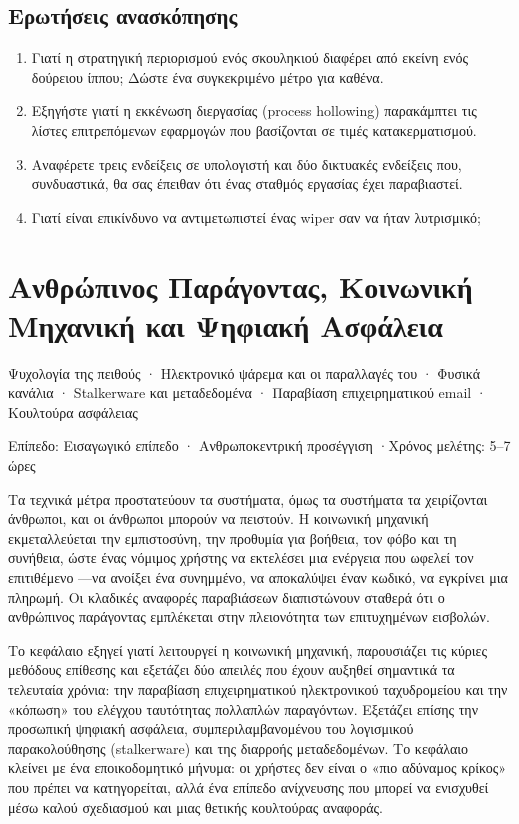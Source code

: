 \documentclass[11pt,openany]{book}
\newcommand{\chaptermeta}[3]{%
  {\sffamily\small\color{accent}#1\par}\vspace{0.3em}
  {\sffamily\footnotesize\color{gray}#2 \quad·\quad #3\par}\vspace{1.2em}}
\begin{document}
\section*{Ερωτήσεις ανασκόπησης}
\begin{enumerate}
  \item Γιατί η στρατηγική περιορισμού ενός σκουληκιού διαφέρει από εκείνη ενός δούρειου ίππου; Δώστε ένα συγκεκριμένο μέτρο για καθένα.
  \item Εξηγήστε γιατί η εκκένωση διεργασίας (process hollowing) παρακάμπτει τις λίστες επιτρεπόμενων εφαρμογών που βασίζονται σε τιμές κατακερματισμού.
  \item Αναφέρετε τρεις ενδείξεις σε υπολογιστή και δύο δικτυακές ενδείξεις που, συνδυαστικά, θα σας έπειθαν ότι ένας σταθμός εργασίας έχει παραβιαστεί.
  \item Γιατί είναι επικίνδυνο να αντιμετωπιστεί ένας wiper σαν να ήταν λυτρισμικό;
\end{enumerate}

\chapter{Ανθρώπινος Παράγοντας, Κοινωνική Μηχανική και Ψηφιακή Ασφάλεια}\label{ch:5}
\chaptermeta{Ψυχολογία της πειθούς · Ηλεκτρονικό ψάρεμα και οι παραλλαγές του · Φυσικά κανάλια · Stalkerware και μεταδεδομένα · Παραβίαση επιχειρηματικού email · Κουλτούρα ασφάλειας}{Επίπεδο: Εισαγωγικό επίπεδο · Ανθρωποκεντρική προσέγγιση}{Χρόνος μελέτης: 5–7 ώρες}

Τα τεχνικά μέτρα προστατεύουν τα συστήματα, όμως τα συστήματα τα χειρίζονται άνθρωποι, και οι άνθρωποι μπορούν να πειστούν. Η κοινωνική μηχανική εκμεταλλεύεται την εμπιστοσύνη, την προθυμία για βοήθεια, τον φόβο και τη συνήθεια, ώστε ένας νόμιμος χρήστης να εκτελέσει μια ενέργεια που ωφελεί τον επιτιθέμενο —να ανοίξει ένα συνημμένο, να αποκαλύψει έναν κωδικό, να εγκρίνει μια πληρωμή. Οι κλαδικές αναφορές παραβιάσεων διαπιστώνουν σταθερά ότι ο ανθρώπινος παράγοντας εμπλέκεται στην πλειονότητα των επιτυχημένων εισβολών.

Το κεφάλαιο εξηγεί γιατί λειτουργεί η κοινωνική μηχανική, παρουσιάζει τις κύριες μεθόδους επίθεσης και εξετάζει δύο απειλές που έχουν αυξηθεί σημαντικά τα τελευταία χρόνια: την παραβίαση επιχειρηματικού ηλεκτρονικού ταχυδρομείου και την «κόπωση» του ελέγχου ταυτότητας πολλαπλών παραγόντων. Εξετάζει επίσης την προσωπική ψηφιακή ασφάλεια, συμπεριλαμβανομένου του λογισμικού παρακολούθησης (stalkerware) και της διαρροής μεταδεδομένων. Το κεφάλαιο κλείνει με ένα εποικοδομητικό μήνυμα: οι χρήστες δεν είναι ο «πιο αδύναμος κρίκος» που πρέπει να κατηγορείται, αλλά ένα επίπεδο ανίχνευσης που μπορεί να ενισχυθεί μέσω καλού σχεδιασμού και μιας θετικής κουλτούρας αναφοράς.
\end{document}
